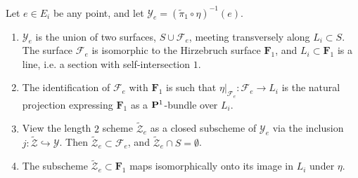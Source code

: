\documentclass[12pt,reqno]{amsart}
\renewcommand{\to}{{\longrightarrow}}
\numberwithin{equation}{section}
\newcommand{\F}{\mathbf F}
\newcommand{\td}{\widetilde}
\begin{document}
\begin{proposition}
  \label{prop:geometry}
  Let $e \in E_{i}$ be any point, and let
  $\mathcal{Y}_{e} = (\td{\pi}_{1} \circ \eta)^{-1}(e)$.
  \begin{enumerate}
  \item $\mathcal{Y}_{e}$ is the union of two surfaces,
    $S \cup \mathcal{F}_{e}$, meeting transversely along
    $L_{i} \subset S$.  The surface $\mathcal{F}_{e}$ is isomorphic to
    the Hirzebruch surface $\F_{1}$, and $L_{i} \subset \F_{1}$ is a
    line, i.e. a section with self-intersection $1$.
  \item The identification of $\mathcal{F}_{e}$ with $\F_{1}$ is such
    that $\eta|_{\mathcal{F}_{e}} : \mathcal{F}_{e} \to L_{i}$ is the
    natural projection expressing $\F_{1}$ as a $\P^{1}$-bundle over
    $L_{i}$.
  \item View the length $2$ scheme $\td{\mathcal{Z}}_{e}$ as a closed
    subscheme of $\mathcal{Y}_{e}$ via the inclusion
    $j : \td{\mathcal{Z}} \hookrightarrow \mathcal{Y}$.  Then
    $\td{\mathcal{Z}}_{e} \subset \mathcal{F}_{e}$, and
    $\td{\mathcal{Z}}_{e} \cap S = \emptyset$.

  \item The subscheme $\td{\mathcal{Z}}_{e} \subset \F_{1}$ maps
    isomorphically onto its image in $L_{i}$ under $\eta$.
  \end{enumerate}
\end{proposition}
\end{document}
